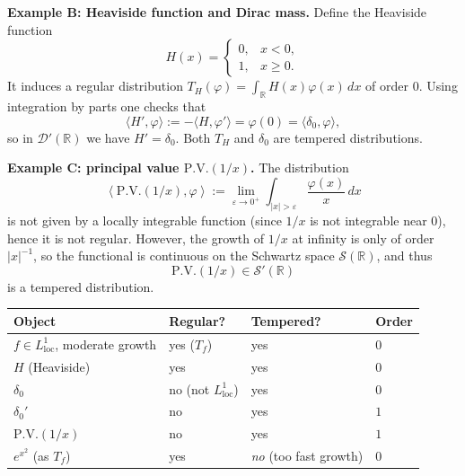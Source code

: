 \begin{problem}[CP-III-0007]
\label{prob:cp-iii-0007}
\par\smallskip\noindent\textbf{Example B: Heaviside function and Dirac mass.}\quad
Define the Heaviside function
\[
H(x) = \begin{cases}
	0, & x<0,\\[0.3em]
	1, & x\ge 0.
\end{cases}
\]
It induces a regular distribution
$T_H(\varphi)=\int_{\mathbb{R}} H(x)\varphi(x)\,dx$ of order $0$.
Using integration by parts one checks that
\[
\langle H',\varphi\rangle
:= -\langle H,\varphi'\rangle
= \varphi(0) = \langle\delta_0,\varphi\rangle,
\]
so in $\mathcal{D}'(\mathbb{R})$ we have $H'=\delta_0$. Both $T_H$ and
$\delta_0$ are tempered distributions.


\par\smallskip\noindent\textbf{Example C: principal value $\mathrm{P.V.}(1/x)$.}\quad
The distribution
\[
\left\langle \mathrm{P.V.}(1/x),\varphi\right\rangle
:= \lim_{\varepsilon\to 0^+}
\int_{|x|>\varepsilon} \frac{\varphi(x)}{x}\,dx
\]
is not given by a locally integrable function (since $1/x$ is not
integrable near $0$), hence it is not regular. However, the growth of
$1/x$ at infinity is only of order $|x|^{-1}$, so the functional is
continuous on the Schwartz space $\mathcal{S}(\mathbb{R})$, and thus
\[
\mathrm{P.V.}(1/x) \in \mathcal{S}'(\mathbb{R})
\]
is a tempered distribution.


\begin{center}
	\begin{tabular}{l|l|l|l}
		Object & Regular? & Tempered? & Order \\ \hline
		$f\in L^1_{\mathrm{loc}}$, moderate growth
		& yes ($T_f$) & yes & $0$ \\[0.2em]
		$H$ (Heaviside) & yes & yes & $0$ \\[0.2em]
		$\delta_0$ & no (not $L^1_{\mathrm{loc}}$)
		& yes & $0$ \\[0.2em]
		$\delta_0'$ & no & yes & $1$ \\[0.2em]
		$\mathrm{P.V.}(1/x)$ & no & yes & $1$ \\[0.2em]
		$e^{x^2}$ (as $T_f$) & yes & \emph{no} (too fast growth) & $0$
	\end{tabular}
\end{center}
\end{problem}

